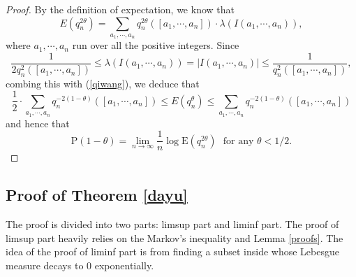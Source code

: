 \documentclass[reqno]{amsart}
\theoremstyle{definition}
\numberwithin{equation}{section}
\begin{document}
\begin{proof}
By the definition of expectation, we know that
\begin{equation}\label{qiwang}
E\left(q_n^{2\theta}\right) = \sum_{a_1,\cdots,a_n} q_n^{2\theta}([a_1,\cdots,a_n])\cdot \lambda\left(I(a_1,\cdots,a_n)\right),
\end{equation}
where $a_1,\cdots,a_n$ run over all the positive integers.
Since
\begin{equation*}
\frac{1}{2q_n^2([a_1,\cdots,a_n])}\leq \lambda\left(I(a_1,\cdots,a_n)\right) = |I(a_1, \cdots, a_n)| \leq \frac{1}{q_n^2([a_1,\cdots,a_n])},
\end{equation*}
combing this with (\ref{qiwang}), we deduce that
\[
\frac{1}{2}\cdot \sum_{a_1,\cdots,a_n} q_n^{-2(1-\theta)}([a_1,\cdots,a_n]) \leq E\left(q_n^\theta\right) \leq \sum_{a_1,\cdots,a_n} q_n^{-2(1-\theta)}([a_1,\cdots,a_n])
\]
and hence that
\[
\mathrm{P}(1-\theta) = \lim_{n \to \infty}\frac{1}{n} \log \mathrm{E}\left(q_n^{2\theta}\right) \ \ \ \text{for any $\theta <1/2$}.
\]
\end{proof}

\subsection{Proof of Theorem \ref{dayu}}
The proof is divided into two parts: limsup part and liminf part. The proof of limsup part heavily relies on the Markov's inequality and Lemma \ref{proofs}. The idea of the proof of liminf part is from finding a subset inside whose Lebesgue measure decays to 0 exponentially.
\end{document}
